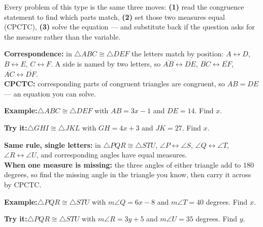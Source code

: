 \documentclass[12pt]{article}
\begin{document}

\noindent\small Every problem of this type is the same three moves:
\textbf{(1)} read the congruence statement to find which parts match,
\textbf{(2)} set those two measures equal (CPCTC),
\textbf{(3)} solve the equation --- and substitute back if the question asks for the
measure rather than the variable.\normalsize

\begin{formulabox}\textbf{Correspondence:} in $\triangle ABC \cong \triangle DEF$ the letters
match by position: $A \leftrightarrow D$, $B \leftrightarrow E$, $C \leftrightarrow F$.
A side is named by two letters, so $\overline{AB} \leftrightarrow \overline{DE}$,
$\overline{BC} \leftrightarrow \overline{EF}$, $\overline{AC} \leftrightarrow \overline{DF}$.\\[3pt]
\textbf{CPCTC:} corresponding parts of congruent triangles are congruent, so
$AB = DE$ --- an equation you can solve.
\end{formulabox}
\begin{examplebox}\textbf{Example:}\quad $\triangle ABC \cong \triangle DEF$ with $AB = 3x - 1$ and $DE = 14$. Find $x$.
\end{examplebox}
\begin{tryitbox}\textbf{Try it:}\quad $\triangle GHI \cong \triangle JKL$ with $GH = 4x + 3$ and $JK = 27$. Find $x$.\\[2pt]
\end{tryitbox}

\begin{formulabox}\textbf{Same rule, single letters:} in $\triangle PQR \cong \triangle STU$,
$\angle P \leftrightarrow \angle S$, $\angle Q \leftrightarrow \angle T$,
$\angle R \leftrightarrow \angle U$, and corresponding angles have equal measures.\\[3pt]
\textbf{When one measure is missing:} the three angles of either triangle add to $180$ degrees,
so find the missing angle in the triangle you know, then carry it across by CPCTC.
\end{formulabox}
\begin{examplebox}\textbf{Example:}\quad $\triangle PQR \cong \triangle STU$ with $m\angle Q = 6x - 8$ and $m\angle T = 40$ degrees. Find $x$.
\end{examplebox}
\begin{tryitbox}\textbf{Try it:}\quad $\triangle PQR \cong \triangle STU$ with $m\angle R = 3y + 5$ and $m\angle U = 35$ degrees. Find $y$.\\[2pt]
\end{tryitbox}
\end{document}
